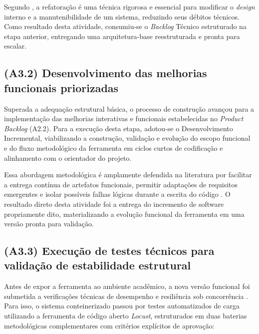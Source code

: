Segundo , a refatoração é uma técnica rigorosa e essencial para modificar o \textit{design} interno e a manutenibilidade de um sistema, reduzindo seus débitos técnicos. Como resultado desta atividade, consumiu-se o \textit{Backlog} Técnico estruturado na etapa anterior, entregando uma arquitetura-base reestruturada e pronta para escalar.

\subsection{(A3.2) Desenvolvimento das melhorias funcionais priorizadas}

Superada a adequação estrutural básica, o processo de construção avançou para a implementação das melhorias interativas e funcionais estabelecidas no \textit{Product Backlog} (A2.2). Para a execução desta etapa, adotou-se o Desenvolvimento Incremental, viabilizando a construção, validação e evolução do escopo funcional e do fluxo metodológico da ferramenta em ciclos curtos de codificação e alinhamento com o orientador do projeto.

Essa abordagem metodológica é amplamente defendida na literatura por facilitar a entrega contínua de artefatos funcionais, permitir adaptações de requisitos emergentes e isolar possíveis falhas lógicas durante a escrita do código \cite{pressman2021}. O resultado direto desta atividade foi a entrega do incremento de software propriamente dito, materializando a evolução funcional da ferramenta em uma versão pronta para validação.

\subsection{(A3.3) Execução de testes técnicos para validação de estabilidade estrutural}

Antes de expor a ferramenta ao ambiente acadêmico, a nova versão funcional foi submetida a verificações técnicas de desempenho e resiliência sob concorrência \cite{sommerville2016}. Para isso, o sistema conteinerizado passou por testes automatizados de carga utilizando a ferramenta de código aberto \textit{Locust}, estruturados em duas baterias metodológicas complementares com critérios explícitos de aprovação:

